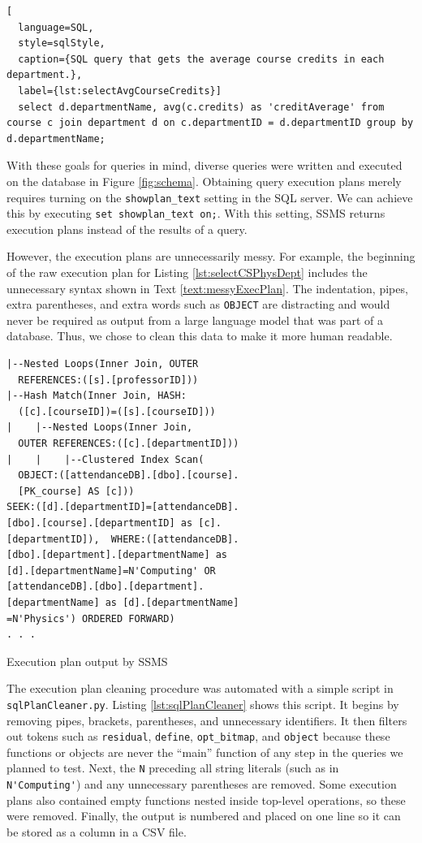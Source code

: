 \begin{lstlisting}[
  language=SQL,
  style=sqlStyle,
  caption={SQL query that gets the average course credits in each department.},
  label={lst:selectAvgCourseCredits}]
  select d.departmentName, avg(c.credits) as 'creditAverage' from course c join department d on c.departmentID = d.departmentID group by d.departmentName;
\end{lstlisting}

With these goals for queries in mind, \dataRows diverse queries were written and executed on the database in Figure \ref{fig:schema}. Obtaining query execution plans merely requires turning on the \lstinline{showplan_text} setting in the SQL server. We can achieve this by executing \lstinline{set showplan_text on;}. With this setting, SSMS returns execution plans instead of the results of a query.

However, the execution plans are unnecessarily messy. For example, the beginning of the raw execution plan for Listing \ref{lst:selectCSPhysDept} includes the unnecessary syntax shown in Text \ref{text:messyExecPlan}. The indentation, pipes, extra parentheses, and extra words such as \lstinline{OBJECT} are distracting and would never be required as output from a large language model that was part of a database. Thus, we chose to clean this data to make it more human readable.

\begin{text}
  \begin{verbatim}
|--Nested Loops(Inner Join, OUTER
  REFERENCES:([s].[professorID]))
|--Hash Match(Inner Join, HASH:
  ([c].[courseID])=([s].[courseID]))
|    |--Nested Loops(Inner Join,
  OUTER REFERENCES:([c].[departmentID]))
|    |    |--Clustered Index Scan(
  OBJECT:([attendanceDB].[dbo].[course].
  [PK_course] AS [c]))
SEEK:([d].[departmentID]=[attendanceDB].
[dbo].[course].[departmentID] as [c].
[departmentID]),  WHERE:([attendanceDB].
[dbo].[department].[departmentName] as 
[d].[departmentName]=N'Computing' OR
[attendanceDB].[dbo].[department].
[departmentName] as [d].[departmentName]
=N'Physics') ORDERED FORWARD)
. . .\end{verbatim}
  \caption{Execution plan output by SSMS}
  \label{text:messyExecPlan}
\end{text}

The execution plan cleaning procedure was automated with a simple script in \lstinline{sqlPlanCleaner.py}. Listing \ref{lst:sqlPlanCleaner} shows this script. It begins by removing pipes, brackets, parentheses, and unnecessary identifiers. It then filters out tokens such as \lstinline{residual}, \lstinline{define}, \lstinline{opt_bitmap}, and \lstinline{object} because these functions or objects are never the ``main'' function of any step in the queries we planned to test. Next, the \lstinline{N} preceding all string literals (such as in \lstinline{N'Computing'}) and any unnecessary parentheses are removed. Some execution plans also contained empty functions nested inside top-level operations, so these were removed. Finally, the output is numbered and placed on one line so it can be stored as a column in a CSV file.

